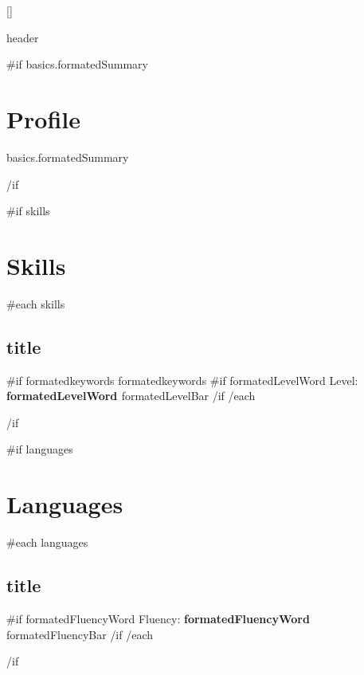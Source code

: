 \documentclass{article}
\begin{document}
\color{primary-950}
\titleformat{\section}{\color{accent}\raggedright\normalsize\bfseries\uppercase}{}{0ex}{}[{\titlerule[0.8pt]}]

{{ header }}

{{#if basics.formatedSummary}}\section*{Profile} {
  {{ basics.formatedSummary }}
  \par
}{{/if}}\ignorespaces

{{#if skills}}\section*{Skills}{
  {{#each skills}}
    \subsection*{ {{ title }} } {
      {{#if formatedkeywords}}{{ formatedkeywords }}\ignorespaces
      {{#if formatedLevelWord}}
        Level: {\bfseries {{ formatedLevelWord }} } \newline
        {{ formatedLevelBar }} \newline
      {{/if}}\ignorespaces
    }
  {{/each}}
}{{/if}}\ignorespaces

{{#if languages}}\section*{Languages}{
  {{#each languages}}
    \subsection*{ {{ title }} } {
      {{#if formatedFluencyWord}}
        Fluency: {\bfseries {{ formatedFluencyWord }} } \newline
        {{ formatedFluencyBar }} \newline
      {{/if}}\ignorespaces
    }
  {{/each}}
}{{/if}}\ignorespaces
\end{document}
